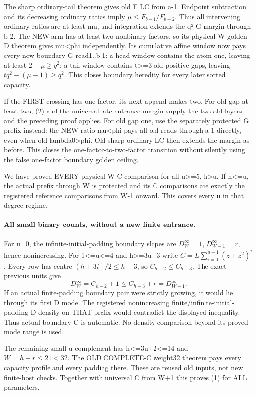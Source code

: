 The sharp ordinary-tail theorem gives old F LC from a-1.
Endpoint subtraction and its decreasing ordinary ratios imply
$\mu\le F_{b-1}/F_{b-2}$.
Thus all intervening ordinary ratios are at least mu, and integration
extends the q² G margin through b-2.
The NEW arm has at least two nonbinary factors, so its physical-W
golden-D theorem gives mu<phi independently.
Its cumulative affine window now pays every new boundary G read1..b-1:
a head window contains the atom one, leaving at least $2-\mu\ge q^2$;
a tail window contains t>=3 old positive gaps, leaving
$tq^2-(\mu-1)\ge q^2$.
This closes boundary heredity for every later sorted capacity.

If the FIRST crossing has one factor, its next append makes two.
For old gap at least two, (2) and the universal late-entrance margin
supply the two old layers and the preceding proof applies.
For old gap one, use the separately protected G prefix instead:
the NEW ratio mu<phi pays all old reads through a-1 directly,
even when old lambda0>phi. Old sharp ordinary LC then extends the
margin as before. This closes the one-factor-to-two-factor transition
without silently using the false one-factor boundary golden ceiling.

We have proved EVERY physical-W C comparison for all u>=5, h>u.
If h<=u, the actual prefix through W is protected and its C comparisons
are exactly the registered reference comparisons from W-1 onward.
This covers every u in that degree regime.

\paragraph{All small binary counts, without a new finite entrance.}
For u=0, the infinite-initial-padding boundary slopes are
$D^\infty_W=1$, $D^\infty_{W-1}=r$, hence nonincreasing.
For 1<=u<=4 and h>=3u+3 write
$C=L\sum_{i=0}^{u-1}(z+z^2)^i$.
Every row has centre $(h+3i)/2\le h-3$, so
$C_{h-2}\le C_{h-3}$.
The exact previous units give
\[
 D^\infty_W=C_{h-2}+1\le C_{h-3}+r=D^\infty_{W-1}.
\]
If an actual finite-padding boundary pair were strictly growing,
it would lie through its first D mode. The registered nonincreasing
finite/infinite-initial-padding D density on THAT prefix would
contradict the displayed inequality. Thus actual boundary C is automatic.
No density comparison beyond its proved mode range is used.

The remaining small-u complement has h<=3u+2<=14 and
$W=h+r\le21<32$. The OLD COMPLETE-C weight32 theorem pays
every capacity profile and every padding there.
These are reused old inputs, not new finite-host checks.
Together with universal C from W+1 this proves (1) for ALL parameters.

